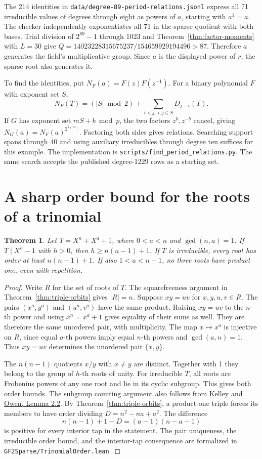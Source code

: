 \documentclass[11pt]{article}
\newtheorem{theorem}{Theorem}
\begin{document}
The 214 identities in \nolinkurl{data/degree-89-period-relations.jsonl}
express all 71 irreducible values of degrees through eight as powers
of \(a\), starting with \(a^1=a\). The checker independently
exponentiates all 71 in the sparse quotient with both bases. Trial
division of \(2^{89}-1\) through 1023 and
Theorem~\ref{thm:factor-moments} with \(L=30\) give
\(Q=14023228315675237/154659929194496>87\). Therefore \(a\)
generates the field's multiplicative group. Since \(a\) is the
displayed power of \(r\), the sparse root also generates it.

To find the identities, put \(N_F(a)=F(z)F(z^{-1})\).
For a binary polynomial \(F\) with exponent set \(S\),
\[
 N_F(T)=(|S|\bmod2)+\sum_{i<j,\ i,j\in S}D_{j-i}(T).
\]
If \(G\) has exponent set \(mS+b\bmod p\), the two factors
\(z^b,z^{-b}\) cancel, giving
\(N_G(a)=N_F(a)^{2^{k(m)}}\). Factoring both sides gives relations.
Searching support spans through 40 and using auxiliary irreducibles
through degree ten suffices for this example. The implementation is
\nolinkurl{scripts/find_period_relations.py}. The same search accepts
the published degree-1229 rows as a starting set.

\section{A sharp order bound for the roots of a trinomial}
\begin{theorem}\label{thm:trinomial-root-quotients}
Let \(T=X^n+X^a+1\), where \(0<a<n\) and \(\gcd(n,a)=1\).
If \(T\mid X^h-1\) with \(h>0\), then \(h\ge n(n-1)+1\).
If \(T\) is irreducible, every root has order at least \(n(n-1)+1\).
If also \(1<a<n-1\), no three roots have product one, even with repetition.
\end{theorem}
\begin{proof}
Write \(R\) for the set of roots of \(T\). The squarefreeness argument in
Theorem~\ref{thm:triple-orbits} gives \(|R|=n\).
Suppose \(xy=uv\) for \(x,y,u,v\in R\).
The pairs \((x^a,y^a)\) and \((u^a,v^a)\) have the same product.
Raising \(xy=uv\) to the \(n\)-th power and using
\(x^n=x^a+1\) gives equality of their sums as well.
They are therefore the same unordered pair, with multiplicity.
The map \(x\mapsto x^a\) is injective on \(R\), since equal \(a\)-th
powers imply equal \(n\)-th powers and \(\gcd(a,n)=1\).
Thus \(xy=uv\) determines the unordered pair \(\{x,y\}\).

The \(n(n-1)\) quotients \(x/y\) with \(x\ne y\) are distinct.
Together with 1 they belong to the group of \(h\)-th roots of unity.
For irreducible \(T\), all roots are Frobenius powers of any one root
and lie in its cyclic subgroup. This gives both order bounds.
The subgroup counting argument also follows from
\href{https://arxiv.org/pdf/1510.01758}{Kelley and Owen, Lemma 2.2}.
By Theorem~\ref{thm:triple-orbits}, a product-one triple forces its
members to have order dividing \(D=n^2-na+a^2\). The difference
\[
       n(n-1)+1-D=(a-1)(n-a-1)
\]
is positive for every interior tap in the statement.
The pair uniqueness, the irreducible order bound, and the interior-tap
consequence are formalized in \nolinkurl{GF2Sparse/TrinomialOrder.lean}.
\end{proof}
\end{document}
